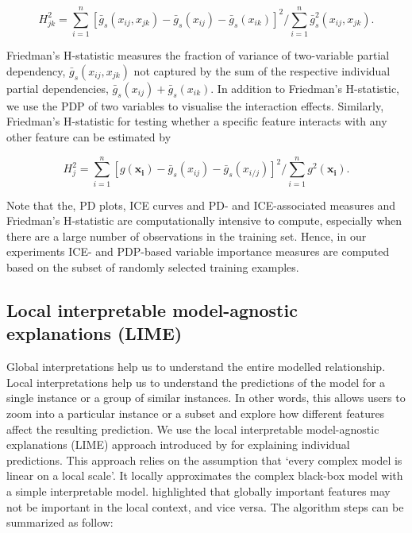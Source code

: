 \documentclass[11pt,a4paper,]{article}
\begin{document}
\[H_{jk}^2=\sum_{i=1}^{n}[\bar{g}_{s}(x_{ij}, x_{jk})-\bar{g}_{s}(x_{ij})-\bar{g}_{s}(x_{ik})]^2/\sum_{i=1}^{n}\bar{g}^2_{s}(x_{ij}, x_{jk}).\]

Friedman's H-statistic measures the fraction of variance of two-variable partial dependency, \(\bar{g}_{s}(x_{ij}, x_{jk})\) not captured by the sum of the respective individual partial dependencies, \(\bar{g}_{s}(x_{ij})+\bar{g}_{s}(x_{ik})\). In addition to Friedman's H-statistic, we use the PDP of two variables to visualise the interaction effects. Similarly, Friedman's H-statistic for testing whether a specific feature interacts with any other feature can be estimated by

\[H_{j}^2=\sum_{i=1}^{n}[{g}(\bm{x_{i}})-\bar{g}_{s}(x_{ij})-\bar{g}_{s}(x_{i/j})]^2/\sum_{i=1}^{n}g^2(\bm{x_{i}}).\]

Note that the, PD plots, ICE curves and PD- and ICE-associated measures and Friedman's H-statistic are computationally intensive to compute, especially when there are a large number of observations in the training set. Hence, in our experiments ICE- and PDP-based variable importance measures are computed based on the subset of randomly selected training examples.

\hypertarget{local-interpretable-model-agnostic-explanations-lime}{%
\subsection{Local interpretable model-agnostic explanations (LIME)}\label{local-interpretable-model-agnostic-explanations-lime}}

Global interpretations help us to understand the entire modelled relationship. Local interpretations help us to understand the predictions of the model for a single instance or a group of similar instances. In other words, this allows users to zoom into a particular instance or a subset and explore how different features affect the resulting prediction. We use the local interpretable model-agnostic explanations (LIME) approach introduced by \textcite{ribeiro2016should} for explaining individual predictions. This approach relies on the assumption that `every complex model is linear on a local scale'. It locally approximates the complex black-box model with a simple interpretable model. \textcite{ribeiro2016should} highlighted that globally important features may not be important in the local context, and vice versa. The algorithm steps can be summarized as follow:
\end{document}
